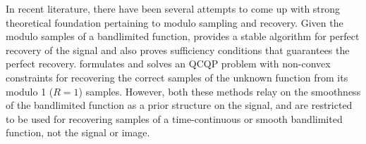 In recent literature, there have been several attempts to come up with strong theoretical foundation pertaining to modulo sampling and recovery. Given the modulo samples of a bandlimited function, \cite{Bhandari} provides a stable algorithm for perfect recovery of the signal and also proves sufficiency conditions that guarantees the perfect recovery. \cite{Cucuringu2017} formulates and solves an QCQP problem with non-convex constraints for recovering the correct samples of the unknown function from its modulo 1 ($R =1$) samples. However, both these methods relay on the smoothness of the bandlimited function as a prior structure on the signal, and are restricted to be used for recovering samples of a time-continuous or smooth bandlimited function, not the signal or image.

